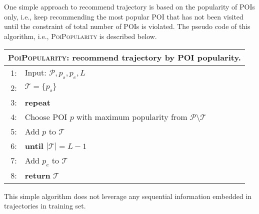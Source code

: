 One simple approach to recommend trajectory is based on the popularity of POIs only,
i.e., keep recommending the most popular POI that has not been visited until the constraint
of total number of POIs is violated. 
The pseudo code of this algorithm, i.e., \textsc{PoiPopularity} is described below.

\begin{table}
\centering
\small
\begin{tabular}{rl}
\hline
\multicolumn{2}{l}{\textsc{PoiPopularity}: recommend trajectory by POI popularity.} \\
\hline
 1:& Input: $\mathcal{P}, p_s, p_e, L$ \\
 2:& $\mathcal{T} = \{p_s\}$ \\
 3:& \textbf{repeat} \\
 4:&\hspace{10pt} Choose POI $p$ with maximum popularity from $\mathcal{P} \setminus \mathcal{T}$ \\
 5:&\hspace{10pt} Add $p$ to $\mathcal{T}$ \\
 6:&\textbf{until} $|\mathcal{T}| = L-1$ \\
 7:& Add $p_e$ to $\mathcal{T}$ \\
 8:& \textbf{return} $\mathcal{T}$ \\
\hline
\end{tabular}
\end{table}

%
This simple algorithm does not leverage any sequential information embedded in trajectories in training set.

